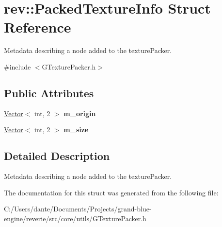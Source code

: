 \hypertarget{structrev_1_1_packed_texture_info}{}\section{rev\+::Packed\+Texture\+Info Struct Reference}
\label{structrev_1_1_packed_texture_info}


Metadata describing a node added to the texture\+Packer.  




{\ttfamily \#include $<$G\+Texture\+Packer.\+h$>$}

\subsection*{Public Attributes}
\begin{DoxyCompactItemize}
\item 
\mbox{\label{structrev_1_1_packed_texture_info_aade609e68f7c60ce9c599f92e38b989a}} 
\mbox{\hyperlink{classrev_1_1_vector}{Vector}}$<$ int, 2 $>$ {\bfseries m\+\_\+origin}
\item 
\mbox{\label{structrev_1_1_packed_texture_info_ae115a3454ded1927ae23cfd972a935af}} 
\mbox{\hyperlink{classrev_1_1_vector}{Vector}}$<$ int, 2 $>$ {\bfseries m\+\_\+size}
\end{DoxyCompactItemize}


\subsection{Detailed Description}
Metadata describing a node added to the texture\+Packer. 

The documentation for this struct was generated from the following file\+:\begin{DoxyCompactItemize}
\item 
C\+:/\+Users/dante/\+Documents/\+Projects/grand-\/blue-\/engine/reverie/src/core/utils/G\+Texture\+Packer.\+h\end{DoxyCompactItemize}
